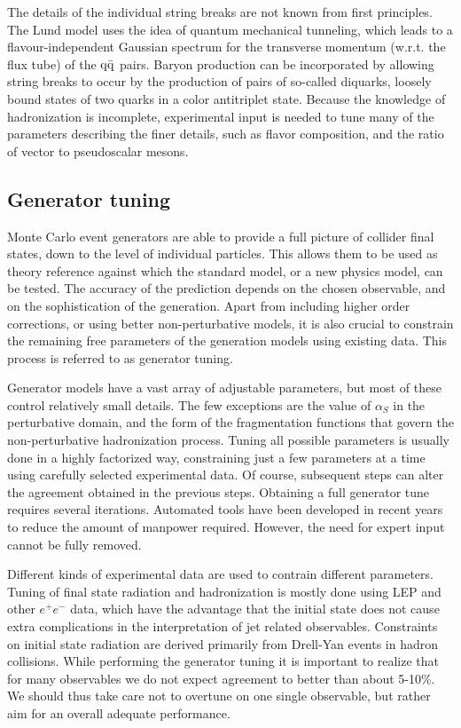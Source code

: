 The details of the individual string breaks are not known from first principles. The Lund model
uses the idea of quantum mechanical tunneling, which leads to a flavour-independent
Gaussian spectrum for the transverse momentum (w.r.t. the flux tube) of the $\mathrm{q} \bar{\mathrm{q}}$ pairs.
Baryon production can be incorporated by allowing string breaks to occur by the production of
pairs of so-called diquarks, loosely bound states of two quarks in a color antitriplet state. 
Because the knowledge of hadronization is incomplete, experimental input is needed to tune many of
the parameters describing the finer details, such as flavor composition, and the ratio of vector to
pseudoscalar mesons. 


\subsection{Generator tuning}

Monte Carlo event generators are able to provide a full picture of collider final states, down to
the level of individual particles. This allows them to be used as theory reference against which
the standard model, or a new physics model, can be tested. The accuracy of the prediction depends
on the chosen observable, and on the sophistication of the generation. 
Apart from including higher order corrections, or using better non-perturbative models, it is also
crucial to constrain the remaining free parameters of the generation models using existing data.
This process is referred to as generator tuning. 

Generator models have a vast array of adjustable parameters, but most of these control relatively
small details. The few exceptions are the value of $\alpha_S$ in the perturbative domain, and the
form of the fragmentation functions that govern the non-perturbative hadronization process. 
Tuning all possible parameters is usually done in a highly factorized way, constraining just a few
parameters at a time using carefully selected experimental data. 
Of course, subsequent steps can alter the agreement obtained in the previous steps. Obtaining a
full generator tune requires several iterations. 
Automated tools have been developed in recent years to reduce the amount of manpower required.
However, the need for expert input cannot be fully removed. 

Different kinds of experimental data are used to contrain different parameters. Tuning of final
state radiation and hadronization is mostly done using LEP and other $e^+ e^-$ data,  which have
the advantage that the initial state does not cause extra complications in the interpretation of jet
related observables. Constraints on initial state radiation are derived primarily from Drell-Yan
events in hadron collisions. 
While performing the generator tuning it is important to realize that for many observables we do
not expect agreement to better than about 5-10\%. We should thus take care not to overtune on one
single observable, but rather aim for an overall adequate performance. 



